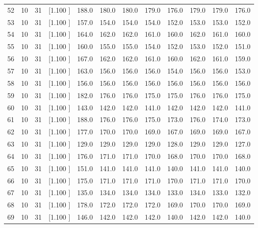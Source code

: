 \documentclass[12pt,a4paper]{article}
\begin{document}
\begin{center}
{\begin{tabular}{r r r r r r r r r r r r}
  52& 10& 31&[1.100     ]&   188.0&   180.0&   180.0&   179.0&   176.0&   179.0&   179.0&   176.0\\[-0.02in]
  53& 10& 31&[1.100     ]&   157.0&   154.0&   154.0&   154.0&   152.0&   153.0&   153.0&   152.0\\[-0.02in]
  54& 10& 31&[1.100     ]&   164.0&   162.0&   162.0&   161.0&   160.0&   162.0&   161.0&   160.0\\[-0.02in]
  55& 10& 31&[1.100     ]&   160.0&   155.0&   155.0&   154.0&   152.0&   153.0&   152.0&   151.0\\[-0.02in]
  56& 10& 31&[1.100     ]&   167.0&   162.0&   162.0&   161.0&   160.0&   162.0&   161.0&   159.0\\[-0.02in]
  57& 10& 31&[1.100     ]&   163.0&   156.0&   156.0&   156.0&   154.0&   156.0&   156.0&   153.0\\[-0.02in]
  58& 10& 31&[1.100     ]&   156.0&   156.0&   156.0&   156.0&   156.0&   156.0&   156.0&   156.0\\[-0.02in]
  59& 10& 31&[1.100     ]&   182.0&   176.0&   176.0&   175.0&   175.0&   176.0&   176.0&   175.0\\[-0.02in]
  60& 10& 31&[1.100     ]&   143.0&   142.0&   142.0&   141.0&   142.0&   142.0&   142.0&   141.0\\[-0.02in]
  61& 10& 31&[1.100     ]&   188.0&   176.0&   176.0&   175.0&   173.0&   176.0&   174.0&   173.0\\[-0.02in]
  62& 10& 31&[1.100     ]&   177.0&   170.0&   170.0&   169.0&   167.0&   169.0&   169.0&   167.0\\[-0.02in]
  63& 10& 31&[1.100     ]&   129.0&   129.0&   129.0&   129.0&   128.0&   129.0&   129.0&   127.0\\[-0.02in]
  64& 10& 31&[1.100     ]&   176.0&   171.0&   171.0&   170.0&   168.0&   170.0&   170.0&   168.0\\[-0.02in]
  65& 10& 31&[1.100     ]&   151.0&   141.0&   141.0&   141.0&   140.0&   141.0&   141.0&   140.0\\[-0.02in]
  66& 10& 31&[1.100     ]&   175.0&   171.0&   171.0&   171.0&   170.0&   171.0&   171.0&   170.0\\[-0.02in]
  67& 10& 31&[1.100     ]&   135.0&   134.0&   134.0&   134.0&   133.0&   134.0&   133.0&   132.0\\[-0.02in]
  68& 10& 31&[1.100     ]&   178.0&   172.0&   172.0&   172.0&   169.0&   170.0&   170.0&   169.0\\[-0.02in]
  69& 10& 31&[1.100     ]&   146.0&   142.0&   142.0&   142.0&   140.0&   142.0&   142.0&   140.0\\[-0.02in]

\end{tabular}}
\end{center}
\end{document}
